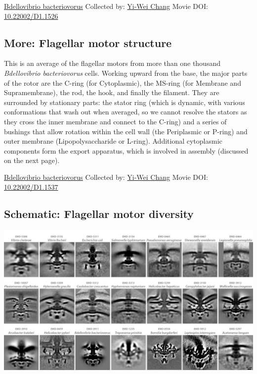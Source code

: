 \documentclass[]{tufte-book}
\begin{document}
\hypertarget{htmlwidget-dbdcc11c42bd647bbb34}{}

\label{fig:6-2}\protect\hyperlink{tree}{Bdellovibrio bacteriovorus} Collected by: \protect\hyperlink{yi-wei_chang}{Yi-Wei Chang} Movie DOI: \href{https://doi.org/10.22002/D1.1526}{10.22002/D1.1526}

\hypertarget{Flagellar_motor_structure}{%
\subsection*{More: Flagellar motor structure}\label{Flagellar_motor_structure}}

This is an average of the flagellar motors from more than one thousand \emph{Bdellovibrio bacteriovorus} cells. Working upward from the base, the major parts of the rotor are the C-ring (for Cytoplasmic), the MS-ring (for Membrane and Supramembrane), the rod, the hook, and finally the filament. They are surrounded by stationary parts: the stator ring (which is dynamic, with various conformations that wash out when averaged, so we cannot resolve the stators as they cross the inner membrane and connect to the C-ring) and a series of bushings that allow rotation within the cell wall (the Periplasmic or P-ring) and outer membrane (Lipopolysaccharide or L-ring). Additional cytoplasmic components form the export apparatus, which is involved in assembly (discussed on the next page).



\hypertarget{htmlwidget-7923c00491711fd7aba8}{}

\label{fig:6-2a}\protect\hyperlink{tree}{Bdellovibrio bacteriovorus} Collected by: \protect\hyperlink{yi-wei_chang}{Yi-Wei Chang} Movie DOI: \href{https://doi.org/10.22002/D1.1537}{10.22002/D1.1537}

\hypertarget{Flagellar_motor_diversity}{%
\subsection*{Schematic: Flagellar motor diversity}\label{Flagellar_motor_diversity}}

\includegraphics{img/schematics/6_2_1}
\end{document}
